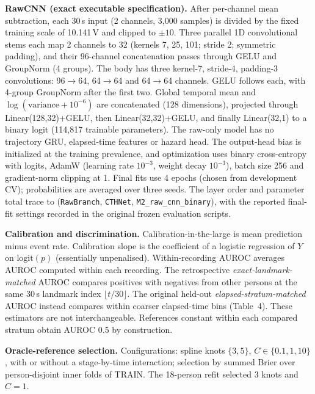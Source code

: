 \documentclass{article}
\begin{document}
\textbf{RawCNN (exact executable specification).} After per-channel mean subtraction, each 30\,s input (2 channels, 3{,}000 samples) is divided by the fixed training scale of 10.141\,\textmu V and clipped to $\pm10$. Three parallel 1D convolutional stems each map 2 channels to 32 (kernels 7, 25, 101; stride 2; symmetric padding), and their 96-channel concatenation passes through GELU and GroupNorm (4 groups). The body has three kernel-7, stride-4, padding-3 convolutions: 96$\to$64, 64$\to$64 and 64$\to$64 channels. GELU follows each, with 4-group GroupNorm after the first two. Global temporal mean and $\log(\mathrm{variance}+10^{-6})$ are concatenated (128 dimensions), projected through Linear(128,32)+GELU, then Linear(32,32)+GELU, and finally Linear(32,1) to a binary logit (114{,}817 trainable parameters). The raw-only model has no trajectory GRU, elapsed-time features or hazard head. The output-head bias is initialized at the training prevalence, and optimization uses binary cross-entropy with logits, AdamW (learning rate $10^{-3}$, weight decay $10^{-3}$), batch size 256 and gradient-norm clipping at 1. Final fits use 4 epochs (chosen from development CV); probabilities are averaged over three seeds. The layer order and parameter total trace to  (\texttt{RawBranch}, \texttt{CTHNet}, \texttt{M2\_raw\_cnn\_binary}), with the reported final-fit settings recorded in the original frozen evaluation scripts.

\textbf{Calibration and discrimination.} Calibration-in-the-large is mean prediction minus event rate. Calibration slope is the coefficient of a logistic regression of $Y$ on $\mathrm{logit}(p)$ (essentially unpenalised). Within-recording AUROC averages AUROC computed within each recording. The retrospective \emph{exact-landmark-matched} AUROC compares positives with negatives from other persons at the same 30\,s landmark index $\lfloor t/30\rfloor$. The original held-out \emph{elapsed-stratum-matched} AUROC instead compares within coarser elapsed-time bins (Table~4). These estimators are not interchangeable. References constant within each compared stratum obtain AUROC 0.5 by construction.

\textbf{Oracle-reference selection.} Configurations: spline knots $\{3,5\}$, $C\in\{0.1,1,10\}$, with or without a stage-by-time interaction; selection by summed Brier over person-disjoint inner folds of TRAIN. The 18-person refit selected 3 knots and $C=1$.
\end{document}
